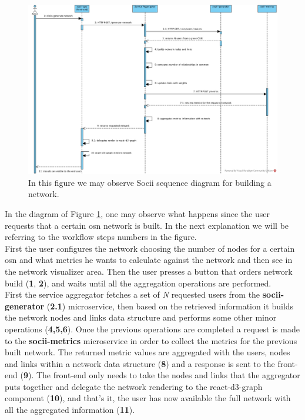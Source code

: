 \begin{figure}[h!]
\begin{center}
  \hspace*{-0.8in}
  \includegraphics[width=1.2\textwidth]{img/socii-sd.jpg}
\end{center}
\caption{\label{img:sociisd} In this figure we may observe Socii sequence diagram for building a network.}
\end{figure}

In the diagram of Figure \ref{img:sociisd}, one may observe what happens since the user requests that a certain \gls{osn} network is built. In the next explanation we will be referring to the workflow steps numbers in the figure.\\
\indent First the user configures the network choosing the number of nodes for a certain \gls{osn} and what metrics he wants to calculate against the network and then see in the network visualizer area. Then the user presses a button that orders network build (\textbf{1}, \textbf{2}), and waits until all the aggregation operations are performed.\\
\indent First the service aggregator fetches a set of \textit{N} requested users from the \textbf{socii-generator} (\textbf{2.1}) microservice, then based on the retrieved information it builds the network nodes and links data structure and performs some other minor operations (\textbf{4,5,6}). Once the previous operations are completed a request is made to the \textbf{socii-metrics} microservice in order to collect the metrics for the previous built network. The returned metric values are aggregated with the users, nodes and links within a network data structure (\textbf{8}) and a response is sent to the front-end (\textbf{9}). The front-end only needs to take the nodes and links that the aggregator puts together and delegate the network rendering to the react-d3-graph component (\textbf{10}), and that's it, the user has now available the full network with all the aggregated information (\textbf{11}).


